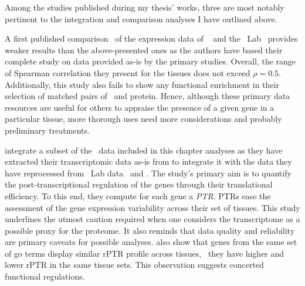 Among the studies published during my thesis' works,
three are most notably pertinent to the integration and comparison analyses
I have outlined above.\mybr\

A first published comparison~ of the expression data of
\gtex\  and the \pandey\ Lab~
provides weaker results than the above-presented ones
as the authors have based their complete study on data provided as-is
by the primary studies.
Overall, the range of Spearman correlation they present for the tissues
does not exceed $\rho=0.5$.
Additionally, this study also fails to show any functional enrichment
in their selection of matched pairs of \mRNA\ and protein.
Hence, although these primary data resources are useful
for others to appraise the presence of a given gene in a particular tissue,
more thorough uses need more considerations
and probably preliminary treatments.\mybr\

\citet{Franks2017-bp} integrate a subset of the \uhlen\ data included
in this chapter analyses
as they have extracted their transcriptomic data as-is from \citet{Uhlen2014}
to integrate it with the data they have reprocessed
from \pandey\ Lab data~ and \citet{KusterData}.
The study's primary aim is
to quantify the post-transcriptional regulation of the genes
through their translational efficiency.
To this end, they compute for each gene a \emph{\gls{PTR}}.
\glspl{PTR} ease the assessment of the gene expression variability
across their set of tissues.
This study underlines the utmost caution required
when one considers the transcriptome as a possible proxy for the proteome.
It also reminds that data quality and reliability are primary caveats
for possible analyses.
\citet{Franks2017-bp} also show that genes from the same set of \gls{go} terms
display similar \gls{rPTR} profile across tissues,
\ie\ they have higher and lower \gls{rPTR} in the same tissue sets.
This observation suggests concerted functional regulations.\mybr\

